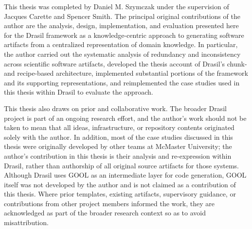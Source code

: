 
This thesis was completed by Daniel M. Szymczak under the supervision of 
Jacques Carette and Spencer Smith. The principal original contributions of the 
author are the analysis, design, implementation, and evaluation presented here 
for the Drasil framework as a knowledge-centric approach to generating software 
artifacts from a centralized representation of domain knowledge. In particular, 
the author carried out the systematic analysis of redundancy and inconsistency 
across scientific software artifacts, developed the thesis account of Drasil's 
chunk- and recipe-based architecture, implemented substantial portions of the 
framework and its supporting representations, and reimplemented the case 
studies used in this thesis within Drasil to evaluate the approach.

This thesis also draws on prior and collaborative work. The broader Drasil 
project is part of an ongoing research effort, and the author's work should not 
be taken to mean that all ideas, infrastructure, or repository contents 
originated solely with the author. In addition, most of the case studies 
discussed in this thesis were originally developed by other teams at McMaster 
University; the author's contribution in this thesis is their analysis and 
re-expression within Drasil, rather than authorship of all original source 
artifacts for those systems. Although Drasil uses GOOL as an intermediate layer 
for code generation, GOOL itself was not developed by the author and is not 
claimed as a contribution of this thesis. Where prior templates, existing 
artifacts, supervisory guidance, or contributions from other project members 
informed the work, they are acknowledged as part of the broader research 
context so as to avoid misattribution.